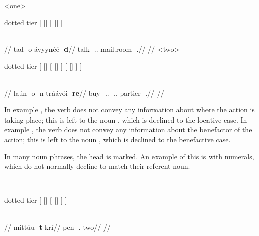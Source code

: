 	\a<one>\begingl
		\glpreamble{}\\
		\begin{forest} dotted tier
			[
				[]
				[
					[]
				]
			]
		\end{forest}\\
		//
		\gla tad -o ávyynéé -\textbf{d}//
		\glb talk -\At.\Dir.\Fps{} mail.room -\Loc.\Sg//
		\glft {}//
	\endgl
	\a<two>\begingl
		\glpreamble{}\\
		\begin{forest} dotted tier
			[
				[]
				[{\elps{}}
					[]
				]
				[
					[]
				]
			]
		\end{forest}\\
		//
		\gla laún -o -n tráávói -\textbf{re}//
		\glb buy -\At.\Dir.\Fps{} -\Idr.\Tps.\Prox{} partier -\Ben.\Pl//
		\glft {}//
	\endgl
\xe

In example , the verb  does not convey any information about where the action is taking place; this is left to the noun , which is declined to the locative case. In example , the verb  does not convey any information about the benefactor of the action; this is left to the noun , which is declined to the benefactive case.

In many noun phrases, the head is marked. An example of this is with numerals, which do not normally decline to match their referent noun.

\begingl
	\glpreamble{}\\
	\begin{forest} dotted tier
		[
			[]
			[
				[]
			]
		]
	\end{forest}\\
	//
	\gla mittúu -\textbf{t} krí//
	\glb pen -\Dir.\Pl{} two//
	\glft {}//
	\endgl
\xe

